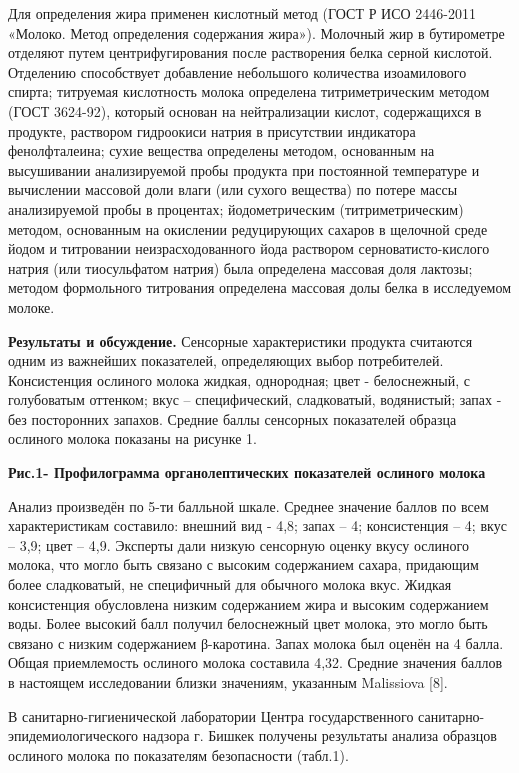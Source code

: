 Для определения жира применен кислотный метод (ГОСТ Р ИСО 2446-2011
«Молоко. Метод определения содержания жира»). Молочный жир в бутирометре
отделяют путем центрифугирования после растворения белка серной
кислотой. Отделению способствует добавление небольшого количества
изоамилового спирта; титруемая кислотность молока определена
титриметрическим методом (ГОСТ 3624-92), который основан на
нейтрализации кислот, содержащихся в продукте, раствором гидроокиси
натрия в присутствии индикатора фенолфталеина; сухие вещества определены
методом, основанным на высушивании анализируемой пробы продукта при
постоянной температуре и вычислении массовой доли влаги (или сухого
вещества) по потере массы анализируемой пробы в процентах;
йодометрическим (титриметрическим) методом, основанным на окислении
редуцирующих сахаров в щелочной среде йодом и титровании
неизрасходованного йода раствором серноватисто-кислого натрия (или
тиосульфатом натрия) была определена массовая доля лактозы; методом
формольного титрования определена массовая долы белка в исследуемом
молоке.

{\bfseries Результаты и обсуждение.} Сенсорные характеристики продукта
считаются одним из важнейших показателей, определяющих выбор
потребителей. Консистенция ослиного молока жидкая, однородная; цвет -
белоснежный, с голубоватым оттенком; вкус -- специфический, сладковатый,
водянистый; запах - без посторонних запахов. Средние баллы сенсорных
показателей образца ослиного молока показаны на рисунке 1.

{\bfseries Рис.1- Профилограмма органолептических показателей ослиного
молока}

Анализ произведён по 5-ти балльной шкале. Среднее значение баллов по
всем характеристикам составило: внешний вид - 4,8; запах -- 4;
консистенция -- 4; вкус -- 3,9; цвет -- 4,9. Эксперты дали низкую
сенсорную оценку вкусу ослиного молока, что могло быть связано с высоким
содержанием сахара, придающим более сладковатый, не специфичный для
обычного молока вкус. Жидкая консистенция обусловлена низким содержанием
жира и высоким содержанием воды. Более высокий балл получил белоснежный
цвет молока, это могло быть связано с низким содержанием β-каротина.
Запах молока был оценён на 4 балла. Общая приемлемость ослиного молока
составила 4,32. Средние значения баллов в настоящем исследовании близки
значениям, указанным Malissiova {[}8{]}.

В санитарно-гигиенической лаборатории Центра государственного
санитарно-эпидемиологического надзора г. Бишкек получены результаты
анализа образцов ослиного молока по показателям безопасности (табл.1).

